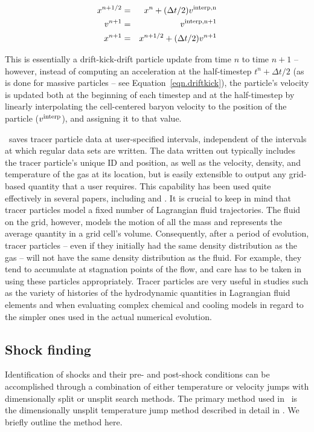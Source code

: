 \begin{eqnarray}
\label{eqn.drifttrace}
x^{n+1/2} & = & x^n + (\Delta t/2) v^{\rm interp,n} \nonumber \\
v^{n+1} & = & v^{\rm interp,n+1} \\
x^{n+1} & = & x^{n+1/2} + (\Delta t/2) v^{n+1} \nonumber
\end{eqnarray}

This is essentially a drift-kick-drift particle update from time $n$
to time $n+1$ -- however, instead of computing an acceleration at the
half-timestep $t^n + \Delta t/2$ (as is done for massive particles --
see Equation~\ref{eqn.driftkick}), the particle's velocity is updated
both at the beginning of each timestep and at the half-timestep by
linearly interpolating the cell-centered baryon velocity to the
position of the particle ($v^{\rm interp}$), and assigning it to that
value.

\enzo\ saves tracer particle data at user-specified intervals,
independent of the intervals at which regular data sets are written.
The data written out typically includes the tracer particle's unique
ID and position, as well as the velocity, density, and temperature of
the gas at its location, but is easily extensible to output any
grid-based quantity that a user requires.  This capability has been
used quite effectively in several papers, including
\citet{2010ApJ...715.1575S} and \citet{2012ApJ...748...12S}. It is
crucial to keep in mind that tracer particles model a fixed number of
Lagrangian fluid trajectories. The fluid on the grid, however, models
the motion of all the mass and represents the average quantity in a
grid cell's volume. Consequently, after a period of evolution, tracer
particles -- even if they initially had the same density distribution
as the gas -- will not have the same density distribution as the
fluid. For example, they tend to accumulate at stagnation points of
the flow, and care has to be taken in using these particles
appropriately. Tracer particles are very useful in studies such as the
variety of histories of the hydrodynamic quantities in Lagrangian
fluid elements and when evaluating complex chemical and cooling models
in regard to the simpler ones used in the actual numerical evolution.

\subsection{Shock finding}

Identification of shocks and their pre- and post-shock conditions can
be accomplished through a combination of either temperature or
velocity jumps with dimensionally split or unsplit search methods.
The primary method used in \enzo~is the dimensionally unsplit
temperature jump method described in detail in
\citet{2008ApJ...689.1063S}.  We briefly outline the method here.

